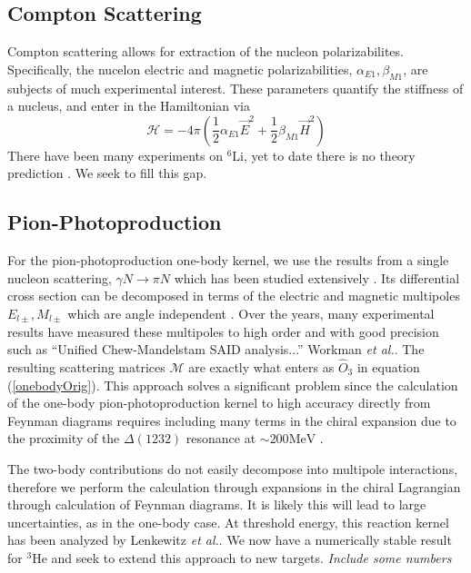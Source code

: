 \documentclass[a4paper,11pt]{article}
\newcommand{\etal}{\textit{et al.}}
\newcommand{\LiS}{{}^{6} \mathrm{Li} }
\newcommand{\HeT}{{}^{3} \mathrm{He}}
\newcommand\bv[1]{\vec{#1}}
\newcommand{\ques}[1]{\color{red}\textit{ #1 }\color{black}}
\newcommand{\MeV}{\mathrm{MeV}}
\begin{document}
\subsection{Compton Scattering}
Compton scattering allows for extraction of the nucleon polarizabilites.
Specifically, the nucelon electric and magnetic polarizabilities, $\alpha_{E1}, \beta_{M1}$, are subjects of much experimental interest. 
These parameters quantify the stiffness of a nucleus, and enter in the Hamiltonian via
\begin{equation}
    \mathcal{H}=-4\pi \left( \frac{1}{2} \alpha_{E1} \bv{E}^2 + \frac{1}{2} \beta_{M1} \bv{H}^2\right)
\end{equation}
There have been many experiments on $\LiS$, yet to date there is no theory prediction \cite{60MeV,86MeV}. We seek to fill this gap.


\subsection{Pion-Photoproduction}
For the pion-photoproduction one-body kernel, we use the results from a single nucleon scattering, $\gamma N \to \pi N$ which has
been studied extensively \cite{pionphoto, Rijneveen2021,Workman2012,Briscoe2023}.
Its differential cross section can be decomposed in terms of the
electric and magnetic multipoles $E_{l\pm}, M_{l\pm}$ which are angle
independent  \cite{pionphoto}.
Over the years, many experimental results have measured 
these multipoles to high order and with good precision
such as ``Unified Chew-Mandelstam SAID analysis...'' Workman \etal \cite{multipolePionPion}.
The resulting scattering matrices $\mathcal{M}$ are exactly what enters as $\hat{O}_3$ in equation (\ref{onebodyOrig}). 
This approach solves a significant problem since the calculation of the one-body pion-photoproduction kernel
to high accuracy directly from Feynman diagrams requires including many terms
in the chiral expansion due to the proximity of the $\Delta(1232)$ resonance at $\sim 200\MeV$ \cite{chiralpionphoto}.

The two-body contributions do not easily decompose into multipole interactions, therefore we perform the calculation through expansions in the chiral Lagrangian through calculation of Feynman diagrams.
It is likely this will lead to large uncertainties, as in the one-body case.
At threshold energy, this reaction kernel has been analyzed by Lenkewitz \etal \cite{L2011, L2013}.
We now have a numerically stable result for $\HeT$ and seek to extend this approach to new targets.
\ques{Include some numbers}
\end{document}
